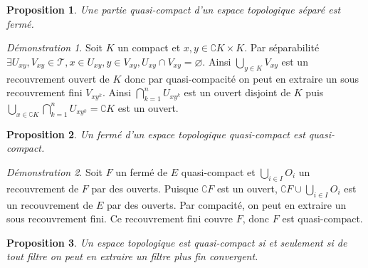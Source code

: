 \documentclass[a4paper, 11pt, french]{book}
\theoremstyle{plain} %
\newtheorem{proposition}{Proposition}
\theoremstyle{definition} %
\theoremstyle{remark} %
\newtheorem*{demonstration}{Démonstration}
\newcommand{\1}{\mathds{1}}
\newcommand\vide{\varnothing}
\newcommand{\scr}[1]{\mathscr{#1}}
\begin{document}
\begin{proposition}
	Une partie quasi-compact d'un espace topologique séparé est fermé.
\end{proposition}

\begin{demonstration}
	Soit $K$ un compact et $x, y\in\complement K\times K$.
	Par séparabilité $\exists U_{xy}, V_{xy}\in\scr{T}, x\in U_{xy}, y\in V_{xy}, U_{xy}\cap V_{xy}=\vide$.
	Ainsi $\bigcup_{y\in K}V_{xy}$ est un recouvrement ouvert de $K$ donc par quasi-compacité on peut en extraire un sous recouvrement fini $V_{xy^k}$.
	Ainsi $\bigcap_{k=1}^nU_{xy^k}$ est un ouvert disjoint de $K$ puis $\bigcup_{x\in\complement K}\bigcap_{k=1}^nU_{xy^k}=\complement K$ est un ouvert.
\end{demonstration}

\begin{proposition}
	Un fermé d'un espace topologique quasi-compact est quasi-compact.
\end{proposition}

\begin{demonstration}
	Soit $F$ un fermé de $E$ quasi-compact et $\bigcup_{i\in I}O_i$ un recouvrement de $F$ par des ouverts.
	Puisque $\complement F$ est un ouvert, $\complement F\cup\bigcup_{i\in I}O_i$ est un recouvrement de $E$ par des ouverts.
	Par compacité, on peut en extraire un sous recouvrement fini.
	Ce recouvrement fini couvre $F$, donc $F$ est quasi-compact.
\end{demonstration}

\begin{proposition}
	Un espace topologique est quasi-compact si et seulement si de tout filtre on peut en extraire un filtre plus fin convergent.
\end{proposition}
\end{document}
